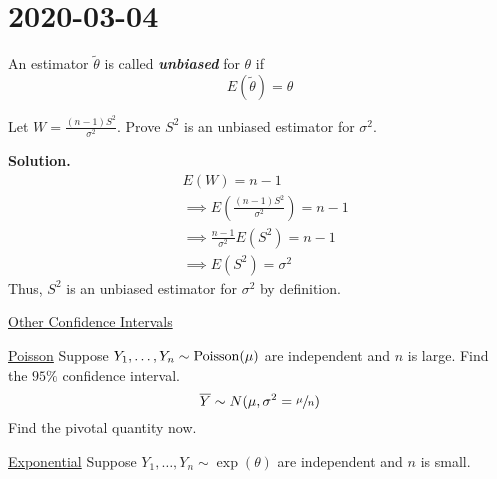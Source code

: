 \section{2020-03-04}
\begin{defbox}
    \begin{definition}
        An estimator $ \tilde{\theta} $ is called \textbf{\emph{unbiased}} for $ \theta $ if
        \[ E(\tilde{\theta})=\theta \]
    \end{definition}
\end{defbox}
\begin{exbox}
    \begin{example}
        Let $ W=\frac{(n-1)S^2}{\sigma^2} $. Prove $ S^2 $ is an unbiased
        estimator for $ \sigma^2 $.

        \textbf{Solution.}
        \begin{align*}
             & E(W)=n-1                                              \\
             & \implies E\left(\frac{(n-1)S^2}{\sigma^2} \right)=n-1 \\
             & \implies \frac{n-1}{\sigma^2} E(S^2)=n-1              \\
             & \implies E(S^2)=\sigma^2
        \end{align*}
        Thus, $ S^2 $ is an unbiased estimator for $ \sigma^2 $ by definition.
    \end{example}
\end{exbox}

\underline{Other Confidence Intervals}

\underline{Poisson}
Suppose $ Y_1,\ldots ,Y_n \sim \operatorname{Poisson}(\mu) $
are independent and $ n $ is large. Find the $ 95\% $ confidence interval.
\[ \overline{Y} \sim N(\mu,\sigma^2=\sfrac{\mu}{n}) \]
Find the pivotal quantity now.

\underline{Exponential}
Suppose $ Y_1,\ldots ,Y_n \sim \exp(\theta) $ are independent and $ n $ is small.

